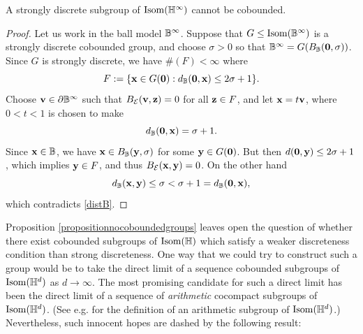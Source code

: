 \begin{proposition}
\label{propositionnocoboundedgroups}
A strongly discrete subgroup of $\Isom(\H^\infty)$ cannot be cobounded.
\end{proposition}
\begin{proof}
Let us work in the ball model $\B^\infty$. Suppose that $G\leq\Isom(\B^\infty)$ is a strongly discrete cobounded group, and choose $\sigma > 0$ so that $\B^\infty = G(B_\B(\0,\sigma))$. Since $G$ is strongly discrete, we have $\#(F) < \infty$ where
\[
F := \{\xx\in G(\0):\dist_\B(\0,\xx) \leq 2\sigma + 1\}.
\]
Choose $\vv\in \del\B^\infty$ such that $B_\mathcal E(\mathbf v,\mathbf z) = 0$ for all $\mathbf z\in F$, and let $\mathbf x = t\mathbf v$, where $0 < t < 1$ is chosen to make
\[
\dist_\B(\0,\xx) = \sigma + 1.
\]
Since $\xx\in\B$, we have $\xx\in B_\B(\yy,\sigma)$ for some $\mathbf y\in G(\mathbf 0)$. But then $d(\mathbf 0,\mathbf y)\leq 2\sigma + 1$, which implies $\mathbf y\in F$, and thus $B_\mathcal E(\mathbf x,\mathbf y) = 0$. On the other hand
\[
\dist_\B(\xx,\yy) \leq \sigma < \sigma + 1 = \dist_\B(\0,\xx),
\]
which contradicts \eqref{distB}.
\end{proof}

Proposition \ref{propositionnocoboundedgroups} leaves open the question of whether there exist cobounded subgroups of $\Isom(\H)$ which satisfy a weaker discreteness condition than strong discreteness. One way that we could try to construct such a group would be to take the direct limit of a sequence cobounded subgroups of $\Isom(\H^d)$ as $d\to\infty$. The most promising candidate for such a direct limit has been the direct limit of a sequence of \emph{arithmetic} cocompact subgroups of $\Isom(\H^d)$. (See e.g. \cite{Belolipetsky_survey} for the definition of an arithmetic subgroup of $\Isom(\H^d)$.) Nevertheless, such innocent hopes are dashed by the following result:

